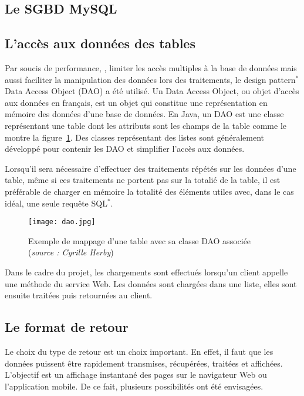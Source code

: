 \subsection{Le SGBD MySQL}

\subsection{L'acc\`es aux donn\'ees des tables}

Par soucis de performance, \cad, limiter les acc\`es multiples \`a la base de donn\'ees mais aussi faciliter la manipulation des donn\'ees lors des traitements, le design pattern$^*$ Data Access Object (DAO) a \'et\'e utilis\'e.
Un Data Access Object, ou objet d'acc\`es aux donn\'ees en fran\c{c}ais, est un objet qui constitue une repr\'esentation en m\'emoire des donn\'ees d'une base de donn\'ees.
En Java, un DAO est une classe repr\'esentant une table dont les attributs sont les champs de la table comme le montre la figure~\ref{figure:dao}.
Des classes repr\'esentant des listes sont g\'en\'eralement d\'evelopp\'e pour contenir les DAO et simplifier l'acc\`es aux donn\'ees.

Lorsqu'il sera n\'ecessaire d'effectuer des traitements r\'ep\'et\'es sur les donn\'ees d'une table, m\^eme si ces traitements ne portent pas sur la totali\'e de la table, il est pr\'ef\'erable de charger en m\'emoire la totalit\'e des \'el\'ements utiles avec, dans le cas id\'eal, une seule requ\^ete SQL$^*$.

\begin{figure}[!ht]
	\centering
	\texttt{[image: dao.jpg]}
	\caption{Exemple de mappage d'une table avec sa classe DAO associ\'ee (\textit{source : Cyrille Herby})}
	\label{figure:dao}

\end{figure}

Dans le cadre du projet, les chargements sont effectu\'es lorsqu'un client appelle une m\'ethode du service Web. 
Les donn\'ees sont charg\'ees dans une liste, elles sont ensuite trait\'ees puis retourn\'ees au client.



\subsection{Le format de retour}
\label{section:formatRetour}

Le choix du type de retour est un choix important.
En effet, il faut que les donn\'ees puissent \^etre rapidement transmises, r\'ecup\'er\'ees, trait\'ees et affich\'ees.
L'objectif est un affichage instantan\'e des pages sur le navigateur Web ou l'application mobile.
De ce fait, plusieurs possibilit\'es ont \'et\'e envisag\'ees.


